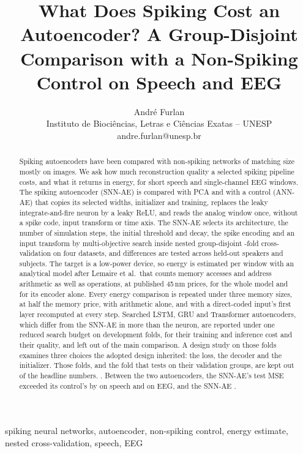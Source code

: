 \documentclass[conference]{IEEEtran}
\title{What Does Spiking Cost an Autoencoder? A Group-Disjoint Comparison
with a Non-Spiking Control on Speech and EEG}
\author{André Furlan\\Instituto de Biociências, Letras e Ciências Exatas -- UNESP\\
andre.furlan@unesp.br}
\begin{document}
\maketitle
\sloppy

\begin{abstract}
Spiking autoencoders have been compared with non-spiking networks of matching size mostly on
images. We ask how much reconstruction quality a selected spiking pipeline costs, and what it
returns in energy, for short speech and single-channel EEG windows.
The spiking autoencoder (SNN-AE) is compared with PCA and with a control (ANN-AE) that copies
its selected widths, initializer and training, replaces the leaky integrate-and-fire neuron by
a leaky ReLU, and reads the analog window once, without a spike code, input transform or time
axis. The SNN-AE selects its architecture, the number of simulation steps, the initial
threshold and decay, the spike encoding and an input transform by multi-objective search inside
nested group-disjoint \cfgFolds-fold cross-validation on four datasets, and differences are
tested across held-out speakers and subjects. The target is a low-power device, so energy is
estimated per window with an analytical model after Lemaire et al.\ that counts memory accesses
and address arithmetic as well as operations, at published 45\,nm prices, for the whole model
and for its encoder alone. Every energy comparison is repeated under three memory sizes, at half
the memory price, with arithmetic alone, and with a direct-coded input's first layer recomputed
at every step.
Searched LSTM, GRU and Transformer autoencoders, which differ from the SNN-AE in more than the
neuron, are reported under one reduced search budget on development folds, for their training
and inference cost and their quality, and left out of the main comparison. A design study on those folds examines three choices the adopted design inherited: the
loss, the decoder and the initializer. Those folds, and the fold that tests on their validation
groups, are kept out of the headline numbers.
\sigPcaVerdict. Between the two autoencoders, the SNN-AE's test MSE exceeded its control's by
\sigGapSpeech{} on speech and \sigGapEeg{} on EEG, and the SNN-AE \energyVsControl.
\end{abstract}

\begin{IEEEkeywords}
spiking neural networks, autoencoder, non-spiking control, energy estimate, nested
cross-validation, speech, EEG
\end{IEEEkeywords}
\end{document}

